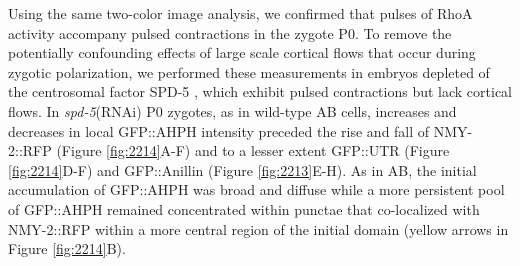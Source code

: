Using the same two-color image analysis, we confirmed that pulses of RhoA activity accompany pulsed contractions in the zygote P0. To remove the potentially confounding effects of large scale cortical flows that occur during zygotic polarization, we performed these measurements in embryos depleted of the centrosomal factor SPD-5 \cite{Munro:2004jk, Hamill:2002tw}, which exhibit pulsed contractions but lack cortical flows. In \textit{spd-5}(RNAi) P0 zygotes, as in wild-type AB cells, increases and decreases in local GFP::AHPH intensity preceded the rise and fall of NMY-2::RFP (Figure \ref{fig:2214}A-F) and to a lesser extent GFP::UTR (Figure \ref{fig:2214}D-F) and GFP::Anillin (Figure \ref{fig:2213}E-H).  As in AB, the initial accumulation of GFP::AHPH was broad and diffuse while a more persistent pool of GFP::AHPH remained concentrated within punctae that co-localized with NMY-2::RFP within a more central region of the initial domain (yellow arrows in Figure \ref{fig:2214}B). 

